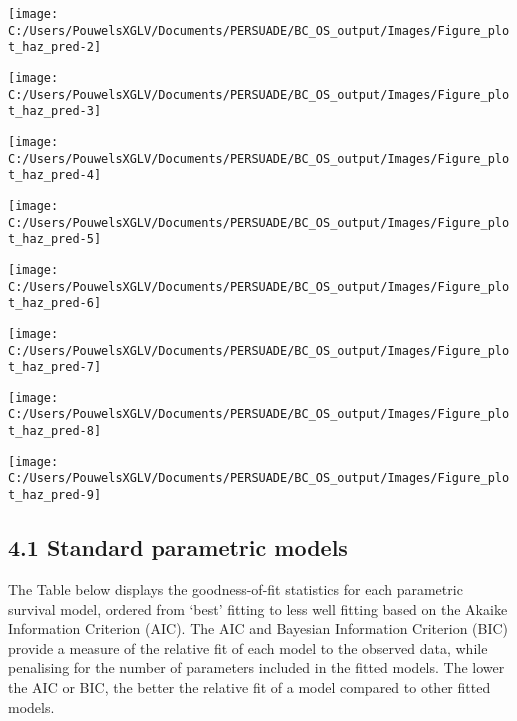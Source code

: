 \documentclass[
]{article}
\begin{document}
\begin{flushleft}\texttt{[image: C:/Users/PouwelsXGLV/Documents/PERSUADE/BC\_OS\_output/Images/Figure\_plot\_haz\_pred-2]} \end{flushleft}

\begin{flushleft}\texttt{[image: C:/Users/PouwelsXGLV/Documents/PERSUADE/BC\_OS\_output/Images/Figure\_plot\_haz\_pred-3]} \end{flushleft}

\begin{flushleft}\texttt{[image: C:/Users/PouwelsXGLV/Documents/PERSUADE/BC\_OS\_output/Images/Figure\_plot\_haz\_pred-4]} \end{flushleft}

\begin{flushleft}\texttt{[image: C:/Users/PouwelsXGLV/Documents/PERSUADE/BC\_OS\_output/Images/Figure\_plot\_haz\_pred-5]} \end{flushleft}

\begin{flushleft}\texttt{[image: C:/Users/PouwelsXGLV/Documents/PERSUADE/BC\_OS\_output/Images/Figure\_plot\_haz\_pred-6]} \end{flushleft}

\begin{flushleft}\texttt{[image: C:/Users/PouwelsXGLV/Documents/PERSUADE/BC\_OS\_output/Images/Figure\_plot\_haz\_pred-7]} \end{flushleft}

\begin{flushleft}\texttt{[image: C:/Users/PouwelsXGLV/Documents/PERSUADE/BC\_OS\_output/Images/Figure\_plot\_haz\_pred-8]} \end{flushleft}

\begin{flushleft}\texttt{[image: C:/Users/PouwelsXGLV/Documents/PERSUADE/BC\_OS\_output/Images/Figure\_plot\_haz\_pred-9]} \end{flushleft}

\subsection{4.1 Standard parametric
models}\label{standard-parametric-models}

The Table below displays the goodness-of-fit statistics for each
parametric survival model, ordered from `best' fitting to less well
fitting based on the Akaike Information Criterion (AIC). The AIC and
Bayesian Information Criterion (BIC) provide a measure of the relative
fit of each model to the observed data, while penalising for the number
of parameters included in the fitted models. The lower the AIC or BIC,
the better the relative fit of a model compared to other fitted models.
\end{document}
